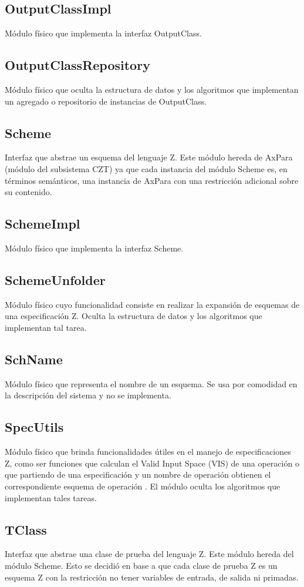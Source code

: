 \documentclass[a4paper,10pt]{report}
\begin{document}
		\subsection{OutputClassImpl}
		Módulo físico que implementa la interfaz OutputClass.
		\subsection{OutputClassRepository}
		Módulo físico que oculta la estructura de datos y los algoritmos que implementan un agregado o repositorio de instancias de OutputClass.
		\subsection{Scheme}
		Interfaz que abstrae un esquema del lenguaje Z. Este módulo hereda de AxPara (módulo del subsistema CZT) ya que cada instancia del módulo Scheme es, en términos semánticos, una instancia de AxPara con una restricción adicional sobre su contenido.
		\subsection{SchemeImpl}
		Módulo físico que implementa la interfaz Scheme.
		\subsection{SchemeUnfolder}
		Módulo físico cuyo funcionalidad consiste en realizar la expansión de esquemas de una especificación Z. Oculta la estructura de datos y los algoritmos que implementan tal tarea.
		\subsection{SchName}
		Módulo físico que representa el nombre de un esquema. Se usa por comodidad en la descripción del sistema y no se implementa.
		\subsection{SpecUtils}
		Módulo físico que brinda funcionalidades útiles en el manejo de especificaciones Z, como ser funciones que calculan el Valid Input Space (VIS) de una operación o que partiendo de una especificación y un nombre de operación obtienen el correspondiente esquema de operación . El módulo oculta los algoritmos que implementan tales tareas.
		\subsection{TClass}
		Interfaz que abstrae una clase de prueba del lenguaje Z. Este módulo hereda del módulo Scheme. Esto se decidió en base a que cada clase de prueba Z es un esquema Z con la restricción no tener variables de entrada, de salida ni primadas.
\end{document}
